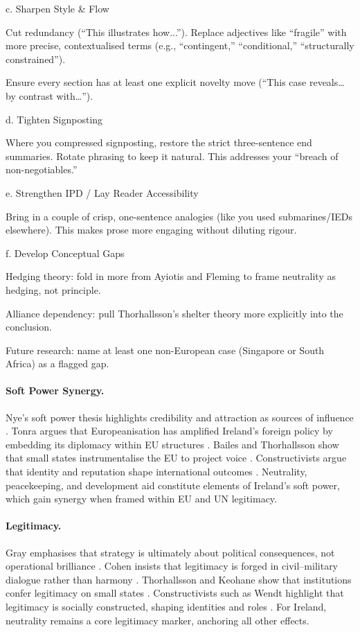 c. Sharpen Style \& Flow

Cut redundancy (“This illustrates how...”). Replace adjectives like “fragile” with more precise, contextualised terms (e.g., “contingent,” “conditional,” “structurally constrained”).

Ensure every section has at least one explicit novelty move (“This case reveals… by contrast with…”).

d. Tighten Signposting

Where you compressed signposting, restore the strict three-sentence end summaries. Rotate phrasing to keep it natural. This addresses your “breach of non-negotiables.”

e. Strengthen IPD / Lay Reader Accessibility

Bring in a couple of crisp, one-sentence analogies (like you used submarines/IEDs elsewhere). This makes prose more engaging without diluting rigour.

f. Develop Conceptual Gaps

Hedging theory: fold in more from Ayiotis and Fleming to frame neutrality as hedging, not principle.

Alliance dependency: pull Thorhallsson’s shelter theory more explicitly into the conclusion.

Future research: name at least one non-European case (Singapore or South Africa) as a flagged gap.



\paragraph{Soft Power Synergy.}  
Nye’s soft power thesis highlights credibility and attraction as sources of influence \parencite{NYE_2008}. Tonra argues that Europeanisation has amplified Ireland’s foreign policy by embedding its diplomacy within EU structures \parencite{TONRA_1999}. Bailes and Thorhallsson show that small states instrumentalise the EU to project voice \parencite{BAILES_2012}. Constructivists argue that identity and reputation shape international outcomes \parencite{BAILES_2013}. Neutrality, peacekeeping, and development aid constitute elements of Ireland’s soft power, which gain synergy when framed within EU and UN legitimacy.

\paragraph{Legitimacy.}  
Gray emphasises that strategy is ultimately about political consequences, not operational brilliance \parencite{GRAY_2018}. Cohen insists that legitimacy is forged in civil–military dialogue rather than harmony \parencite{COHEN_2002}. Thorhallsson and Keohane show that institutions confer legitimacy on small states \parencite{THORHALLSSON_2006, KEOHANE_1988}. Constructivists such as Wendt highlight that legitimacy is socially constructed, shaping identities and roles \parencite{WENDT_1999}. For Ireland, neutrality remains a core legitimacy marker, anchoring all other effects.

